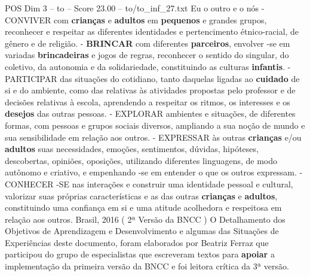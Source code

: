 \begin{textsample}{POS Dim 3 – to – Score 23.00 – to/to\_inf\_27.txt}
Eu o outro e o nós - CONVIVER com \textbf{crianças} e \textbf{adultos} em \textbf{pequenos} e grandes grupos, reconhecer e respeitar as diferentes identidades e pertencimento étnico-racial, de gênero e de religião. - \textbf{BRINCAR} com diferentes \textbf{parceiros}, envolver -se em variadas \textbf{brincadeiras} e jogos de regras, reconhecer o sentido do singular, do coletivo, da autonomia e da solidariedade, constituindo as culturas \textbf{infantis}. - PARTICIPAR das situações do cotidiano, tanto daquelas ligadas ao \textbf{cuidado} de si e do ambiente, como das relativas às atividades propostas pelo professor e de decisões relativas à escola, aprendendo a respeitar os ritmos, os interesses e os \textbf{desejos} das outras pessoas. - EXPLORAR ambientes e situações, de diferentes formas, com pessoas e grupos sociais diversos, ampliando a sua noção de mundo e sua sensibilidade em relação aos outros. - EXPRESSAR às outras \textbf{crianças} e/ou \textbf{adultos} suas necessidades, emoções, sentimentos, dúvidas, hipóteses, descobertas, opiniões, oposições, utilizando diferentes linguagens, de modo autônomo e criativo, e empenhando -se em entender o que os outros expressam. - CONHECER -SE nas interações e construir uma identidade pessoal e cultural, valorizar suas próprias características e as das outras \textbf{crianças} e \textbf{adultos}, constituindo uma confiança em si e uma atitude acolhedora e respeitosa em relação aos outros.
Brasil, 2016 ( 2ª Versão da BNCC ) O Detalhamento dos Objetivos de Aprendizagem e Desenvolvimento e algumas das Situações de Experiências deste documento, foram elaborados por Beatriz Ferraz que participou do grupo de especialistas que escreveram textos para \textbf{apoiar} a implementação da primeira versão da BNCC e foi leitora crítica da 3ª versão.

\end{textsample}
